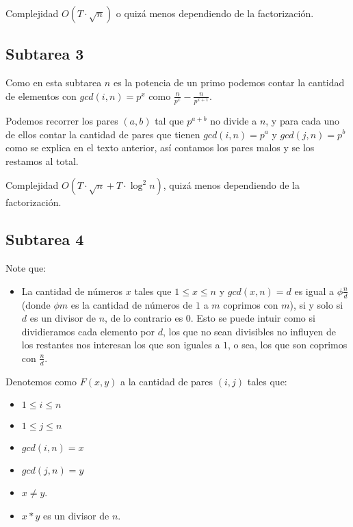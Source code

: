 Complejidad \(O(T \cdot \sqrt{n})\) o quizá menos dependiendo de la
factorización.

\hypertarget{subtarea-3}{%
\subsection{Subtarea 3}\label{subtarea-3}}

Como en esta subtarea \(n\) es la potencia de un primo podemos contar la
cantidad de elementos con \(gcd(i, n) = p^x\) como
\(\frac{n}{p^x} - \frac{n}{p^{x+1}}\).

Podemos recorrer los pares \((a, b)\) tal que \(p^{a+b}\) no divide a
\(n\), y para cada uno de ellos contar la cantidad de pares que tienen
\(gcd(i,n) = p^a\) y \(gcd(j,n) = p^b\) como se explica en el texto
anterior, así contamos los pares malos y se los restamos al total.

Complejidad \(O(T \cdot \sqrt {n} + T \cdot \log^2 n)\), quizá menos
dependiendo de la factorización.

\hypertarget{subtarea-4}{%
\subsection{Subtarea 4}\label{subtarea-4}}

Note que:

\begin{itemize}
\tightlist
\item
  La cantidad de números \(x\) tales que \(1 \leq x \leq n\) y
  \(gcd(x,n) = d\) es igual a \(\phi{\frac{n}{d}}\) (donde \(\phi{m}\)
  es la cantidad de números de \(1\) a \(m\) coprimos con \(m\)), si y
  solo si \(d\) es un divisor de \(n\), de lo contrario es \(0\). Esto
  se puede intuir como si dividieramos cada elemento por \(d\), los que
  no sean divisibles no influyen de los restantes nos interesan los que
  son iguales a \(1\), o sea, los que son coprimos con \(\frac{n}{d}\).
\end{itemize}

Denotemos como \(F(x, y)\) a la cantidad de pares \((i, j)\) tales que:

\begin{itemize}
\tightlist
\item
  \(1 \leq i \leq n\)
\item
  \(1 \leq j \leq n\)
\item
  \(gcd(i, n) = x\)
\item
  \(gcd(j, n) = y\)
\item
  \(x \neq y\).
\item
  \(x * y\) es un divisor de \(n\).
\end{itemize}

